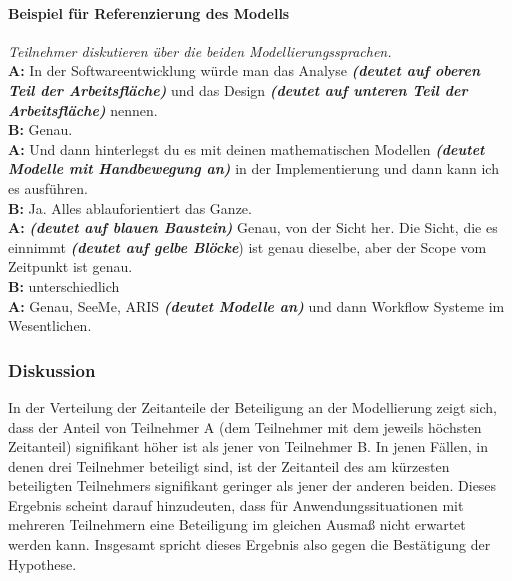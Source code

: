 \paragraph{Beispiel für Referenzierung des Modells} %
\begin{transkript}
	\emph{Teilnehmer diskutieren über die beiden Modellierungssprachen.} \\
	\textbf{A:} In der Softwareentwicklung würde man das Analyse \emph{\textbf{(deutet auf oberen Teil der Arbeitsfläche)}} und das Design \emph{\textbf{(deutet auf unteren Teil der Arbeitsfläche)}} nennen. \\
	\textbf{B:} Genau. \\
	\textbf{A:} Und dann hinterlegst du es mit deinen mathematischen Modellen \emph{\textbf{(deutet Modelle mit Handbewegung an)}} in der Implementierung und dann kann ich es ausführen. \\
	\textbf{B:} Ja. Alles ablauforientiert das Ganze. \\
	\textbf{A:} \emph{\textbf{(deutet auf blauen Baustein)}} Genau, von der Sicht her. Die Sicht, die es einnimmt \emph{\textbf{(deutet auf gelbe Blöcke}}) ist genau dieselbe, aber der Scope vom Zeitpunkt ist genau. \\
	\textbf{B:} unterschiedlich \\
	\textbf{A:} Genau, SeeMe, ARIS \emph{\textbf{(deutet Modelle an)}} und dann Workflow Systeme im Wesentlichen. \\
\end{transkript}

\subsubsection{Diskussion} %

In der Verteilung der Zeitanteile der Beteiligung an der Modellierung zeigt sich, dass der Anteil von Teilnehmer A (dem Teilnehmer mit dem jeweils höchsten Zeitanteil) signifikant höher ist als jener von Teilnehmer B. In jenen Fällen, in denen drei Teilnehmer beteiligt sind, ist der Zeitanteil des am kürzesten beteiligten Teilnehmers signifikant geringer als jener der anderen beiden. Dieses Ergebnis scheint darauf hinzudeuten, dass für Anwendungssituationen mit mehreren Teilnehmern eine Beteiligung im gleichen Ausmaß nicht erwartet werden kann. Insgesamt spricht dieses Ergebnis also gegen die Bestätigung der Hypothese. 

